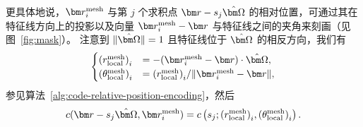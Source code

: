 更具体地说，$\br^{\text{mesh}}_i$ 与第 $j$ 个求积点 $\br-s_j \bOmega$ 的相对位置，可通过其在特征线方向上的投影以及向量 $\br^{\text{mesh}}_i-\br$ 与特征线之间的夹角来刻画（见图~\ref{fig:mask}）。
注意到 $\|\bOmega \| = 1$ 且特征线位于 $\bOmega$ 的相反方向，我们有
\begin{equation}
    \begin{cases}
        {(r^\text{mesh}_\text{local})}_i      & = -(\br^\text{mesh}_i - \br)\cdot \bOmega,                          \\
        {(\theta^\text{mesh}_\text{local})}_i & = {(r^\text{mesh}_\text{local})}_i / \| \br^\text{mesh}_i - \br \|,
    \end{cases}
\end{equation}
参见算法~\ref{alg:code-relative-position-encoding}，然后
\begin{equation}
    c(\br-s_j\bOmega, \br^{\text{mesh}}_i) = c\left(s_j; {(r^\text{mesh}_\text{local})}_i, {(\theta^\text{mesh}_\text{local})}_i\right).
\end{equation}




